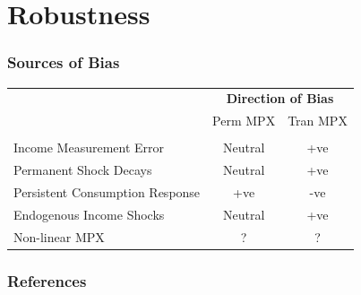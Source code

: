 \documentclass{beamer}
\begin{document}
\section{Robustness}
\frame
{
	\frametitle{Sources of Bias}
  \begin{minipage}{\textwidth}
  \begin{table}
	\label{table:sourcesofbias}
	\begin{tabular}{lcc}  
		\\ & \multicolumn{2}{c}{\textbf{Direction of Bias} }  
		\\ & Perm MPX & Tran MPX
		\\ \hline
		\\ Income Measurement Error &  Neutral & +ve
		\\ Permanent Shock Decays & Neutral & +ve
		\\ Persistent Consumption Response & +ve & -ve
		\\ Endogenous Income Shocks & Neutral & +ve
		\\ Non-linear MPX	& ? & ?
	\end{tabular}
	\end{table}
	\end{minipage}
}


\tiny

\beamerdefaultoverlayspecification{<*>}

\begin{frame}[t,allowframebreaks]
	\frametitle{References}
	
	
	
\end{frame}

\normalsize
\end{document}
